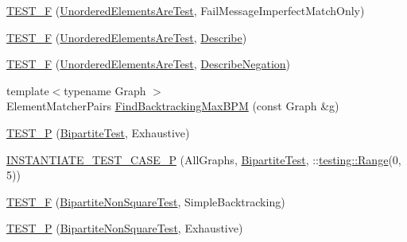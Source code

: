 \begin{DoxyCompactItemize}
\item 
\mbox{\hyperlink{namespacetesting_1_1gmock__matchers__test_ac70f9f9717f35352349b076654094f6a}{T\+E\+S\+T\+\_\+F}} (\mbox{\hyperlink{classtesting_1_1gmock__matchers__test_1_1UnorderedElementsAreTest}{Unordered\+Elements\+Are\+Test}}, Fail\+Message\+Imperfect\+Match\+Only)
\item 
\mbox{\hyperlink{namespacetesting_1_1gmock__matchers__test_a937f4d835023cd6322eb7d32596f3f43}{T\+E\+S\+T\+\_\+F}} (\mbox{\hyperlink{classtesting_1_1gmock__matchers__test_1_1UnorderedElementsAreTest}{Unordered\+Elements\+Are\+Test}}, \mbox{\hyperlink{namespacetesting_1_1gmock__matchers__test_a738a538e1705ea49670aeb3ed25108e6}{Describe}})
\item 
\mbox{\hyperlink{namespacetesting_1_1gmock__matchers__test_a3c4c92b68a08c5d541e46ed367e216ab}{T\+E\+S\+T\+\_\+F}} (\mbox{\hyperlink{classtesting_1_1gmock__matchers__test_1_1UnorderedElementsAreTest}{Unordered\+Elements\+Are\+Test}}, \mbox{\hyperlink{namespacetesting_1_1gmock__matchers__test_a96c18b92dede79060a7303fe5d178faf}{Describe\+Negation}})
\item 
{\footnotesize template$<$typename Graph $>$ }\\Element\+Matcher\+Pairs \mbox{\hyperlink{namespacetesting_1_1gmock__matchers__test_a09321a8d4a4c40ab1e369fbdf92b0414}{Find\+Backtracking\+Max\+B\+PM}} (const Graph \&g)
\item 
\mbox{\hyperlink{namespacetesting_1_1gmock__matchers__test_a20589d957fcfe5399e249084dbc23e82}{T\+E\+S\+T\+\_\+P}} (\mbox{\hyperlink{classtesting_1_1gmock__matchers__test_1_1BipartiteTest}{Bipartite\+Test}}, Exhaustive)
\item 
\mbox{\hyperlink{namespacetesting_1_1gmock__matchers__test_a16ff96ce4f97da6215f889baccd57e87}{I\+N\+S\+T\+A\+N\+T\+I\+A\+T\+E\+\_\+\+T\+E\+S\+T\+\_\+\+C\+A\+S\+E\+\_\+P}} (All\+Graphs, \mbox{\hyperlink{classtesting_1_1gmock__matchers__test_1_1BipartiteTest}{Bipartite\+Test}}, \+::\mbox{\hyperlink{namespacetesting_a265ed70a86cf2d6641582c45ad9529e2}{testing\+::\+Range}}(0, 5))
\item 
\mbox{\hyperlink{namespacetesting_1_1gmock__matchers__test_a7d2395b1cb6a90bdc8d46ae06f99f6c7}{T\+E\+S\+T\+\_\+F}} (\mbox{\hyperlink{classtesting_1_1gmock__matchers__test_1_1BipartiteNonSquareTest}{Bipartite\+Non\+Square\+Test}}, Simple\+Backtracking)
\item 
\mbox{\hyperlink{namespacetesting_1_1gmock__matchers__test_a3ac913ed55a7ac2636ae7bfce04296e9}{T\+E\+S\+T\+\_\+P}} (\mbox{\hyperlink{classtesting_1_1gmock__matchers__test_1_1BipartiteNonSquareTest}{Bipartite\+Non\+Square\+Test}}, Exhaustive)

\end{DoxyCompactItemize}

